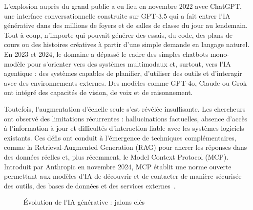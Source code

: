 L'explosion auprès du grand public a eu lieu en novembre 2022 avec ChatGPT, une
interface conversationnelle construite sur GPT-3.5 qui a fait entrer l'IA générative
dans des millions de foyers et de salles de classe du jour au lendemain. Tout à coup,
n'importe qui pouvait générer des essais, du code, des plans de cours ou des histoires
créatives à partir d'une simple demande en langage naturel. En 2023 et 2024, le domaine
a dépassé le cadre des simples chatbots mono-modèle pour s'orienter vers des systèmes
multimodaux et, surtout, vers l'IA agentique : des systèmes capables de planifier,
d'utiliser des outils et d'interagir avec des environnements externes. Des modèles
comme GPT-4o, Claude ou Grok ont intégré des capacités de vision, de voix et de
raisonnement.

Toutefois, l'augmentation d'échelle seule s'est révélée insuffisante. Les chercheurs
ont observé des limitations récurrentes : hallucinations factuelles, absence d'accès
à l'information à jour et difficultés d'interaction fiable avec les systèmes logiciels
existants. Ces défis ont conduit à l'émergence de techniques complémentaires, comme la
Retrieval-Augmented Generation (RAG) pour ancrer les réponses dans des données réelles
et, plus récemment, le Model Context Protocol (MCP). Introduit par Anthropic en novembre
2024, MCP établit une norme ouverte permettant aux modèles d'IA de découvrir et de
contacter de manière sécurisée des outils, des bases de données et des services
externes~\cite{anthropic2024}.

\begin{figure}[htbp]
\centering
{}%
\caption{Évolution de l'IA générative : jalons clés}
\label{fig:timeline}
\end{figure}

